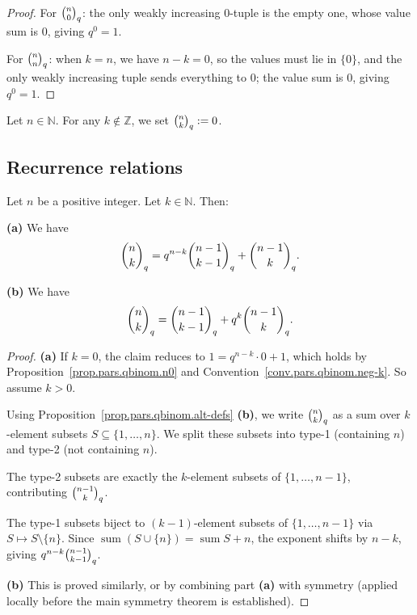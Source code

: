 \begin{proof}
\leanok
For $\dbinom{n}{0}_q$: the only weakly increasing $0$-tuple
is the empty one, whose value sum is $0$, giving $q^0 = 1$.

For $\dbinom{n}{n}_q$: when $k = n$, we have $n - k = 0$, so the values
must lie in $\{0\}$, and the only weakly increasing tuple sends
everything to $0$; the value sum is $0$, giving $q^0 = 1$.
\end{proof}

\begin{convention}
\label{conv.pars.qbinom.neg-k}
Let $n\in\mathbb{N}$. For any $k\notin\mathbb{Z}$, we set $\dbinom{n}{k}_{q}:=0$.
\end{convention}

\subsection{Recurrence relations}

\begin{theorem}
\label{thm.pars.qbinom.rec}
\leantarget
\leanok
Let $n$ be a positive integer. Let $k\in\mathbb{N}$.
Then:

\textbf{(a)} We have
\[
\dbinom{n}{k}_{q}=q^{n-k}\dbinom{n-1}{k-1}_{q}+\dbinom{n-1}{k}_{q}.
\]

\textbf{(b)} We have
\[
\dbinom{n}{k}_{q}=\dbinom{n-1}{k-1}_{q}+q^{k}\dbinom{n-1}{k}_{q}.
\]
\end{theorem}

\begin{proof}
\textbf{(a)} If $k=0$, the claim reduces to $1 = q^{n-k}\cdot 0 + 1$, which
holds by Proposition~\ref{prop.pars.qbinom.n0} and Convention~\ref{conv.pars.qbinom.neg-k}.
So assume $k > 0$.

Using Proposition~\ref{prop.pars.qbinom.alt-defs} \textbf{(b)}, we write
$\dbinom{n}{k}_q$ as a sum over $k$-element subsets $S \subseteq \{1,\ldots,n\}$.
We split these subsets into type-1 (containing $n$) and type-2 (not containing $n$).

The type-2 subsets are exactly the $k$-element subsets of $\{1,\ldots,n-1\}$,
contributing $\dbinom{n-1}{k}_q$.

The type-1 subsets biject to $(k{-}1)$-element subsets of $\{1,\ldots,n-1\}$
via $S \mapsto S \setminus \{n\}$. Since $\operatorname{sum}(S\cup\{n\}) =
\operatorname{sum}S + n$, the exponent shifts by $n - k$, giving
$q^{n-k}\dbinom{n-1}{k-1}_q$.

\textbf{(b)} This is proved similarly, or by combining part \textbf{(a)} with
symmetry (applied locally before the main symmetry theorem is established).
\end{proof}

